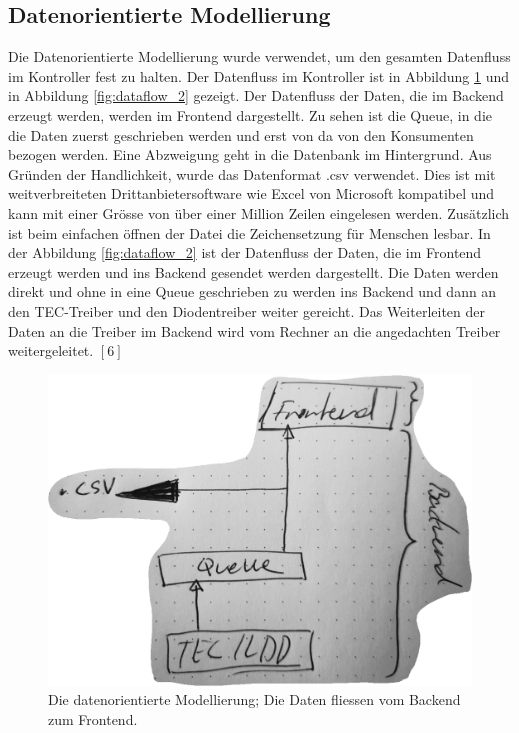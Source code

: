 \subsection{Datenorientierte Modellierung}
Die Datenorientierte Modellierung wurde verwendet, um den gesamten Datenfluss im Kontroller fest zu halten. Der Datenfluss im Kontroller ist in Abbildung \ref{fig:dataflow_1} und in Abbildung \ref{fig:dataflow_2} gezeigt. Der Datenfluss der Daten, die im Backend erzeugt werden, werden im Frontend dargestellt. Zu sehen ist die Queue, in die die Daten zuerst geschrieben werden und erst von da von den Konsumenten bezogen werden. Eine Abzweigung geht in die Datenbank im Hintergrund. Aus Gründen der Handlichkeit, wurde das Datenformat .csv verwendet. Dies ist mit weitverbreiteten Drittanbietersoftware wie Excel von Microsoft kompatibel und kann mit einer Grösse von über einer Million Zeilen eingelesen werden. Zusätzlich ist beim einfachen öffnen der Datei die Zeichensetzung für Menschen lesbar. In der Abbildung \ref{fig:dataflow_2} ist der Datenfluss der Daten, die im Frontend erzeugt werden und ins Backend gesendet werden dargestellt. Die Daten werden direkt und ohne in eine Queue geschrieben zu werden ins Backend und dann an den TEC-Treiber und den Diodentreiber weiter gereicht. Das Weiterleiten der Daten an die Treiber im Backend wird vom Rechner an die angedachten Treiber weitergeleitet. $[6]$  %

\begin{figure}
    \centering
    \includegraphics[scale=0.3]{98_images/data_flow_backend_frontend_tec_ldd.PNG}
    \caption{Die datenorientierte Modellierung; Die Daten fliessen vom Backend zum Frontend.}
    \label{fig:dataflow_1}
\end{figure}

